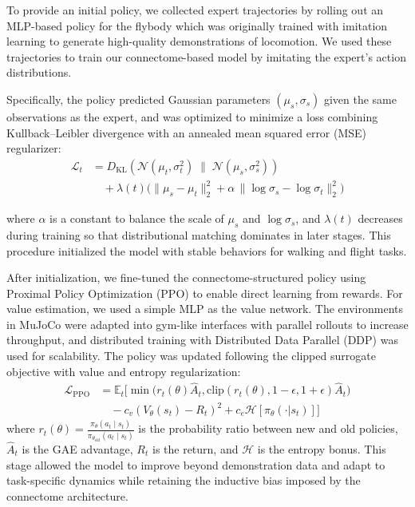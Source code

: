 \documentclass{article}
\theoremstyle{plain}
\theoremstyle{definition}
\theoremstyle{remark}
\begin{document}
To provide an initial policy, we collected expert trajectories by rolling out an MLP-based policy for the flybody which was originally trained with imitation learning to generate high-quality demonstrations of locomotion. We used these trajectories to train our connectome-based model by imitating the expert’s action distributions. 

Specifically, the policy predicted Gaussian parameters $(\mu_s, \sigma_s)$ given the same observations as the expert, and was optimized to minimize a loss combining Kullback–Leibler divergence with an annealed mean squared error (MSE) regularizer:
\begin{equation}
\begin{aligned}
    \mathcal{L}_t &= D_{\mathrm{KL}}\!\left( \mathcal{N}(\mu_t, \sigma_t^2) \;\|\; \mathcal{N}(\mu_s, \sigma_s^2) \right) \\
    &\quad + \lambda(t) \Big( \|\mu_s - \mu_t\|_2^2 + \alpha \,\|\log \sigma_s - \log \sigma_t\|_2^2 \Big)
\end{aligned}
\end{equation}

where $\alpha$ is a constant to balance the scale of $\mu_s$ and $\log \sigma_s$, and $\lambda(t)$ decreases during training so that distributional matching dominates in later stages. This procedure initialized the model with stable behaviors for walking and flight tasks.


After initialization, we fine-tuned the connectome-structured policy using Proximal Policy Optimization (PPO) to enable direct learning from rewards. For value estimation, we used a simple MLP as the value network. The environments in MuJoCo were adapted into gym-like interfaces with parallel rollouts to increase throughput, and distributed training with Distributed Data Parallel (DDP) was used for scalability. The policy was updated following the clipped surrogate objective with value and entropy regularization:
\begin{equation}
\begin{aligned}
\mathcal{L}_{\text{PPO}} &= \mathbb{E}_t \Big[ \min\big(r_t(\theta) \hat{A}_t, \text{clip}(r_t(\theta), 1-\epsilon, 1+\epsilon)\hat{A}_t\big) \\
&\quad - c_v (V_\theta(s_t) - R_t)^2 + c_e \mathcal{H}[\pi_\theta(\cdot|s_t)] \Big]
\end{aligned}
\end{equation}
where $ r_t(\theta)=\frac{\pi_\theta(a_t \mid s_t)}{\pi_{\theta_{\text{old}}}(a_t \mid s_t)} $ is the probability ratio between new and old policies, $\hat{A}_t$ is the GAE advantage, $R_t$ is the return, and $\mathcal{H}$ is the entropy bonus. This stage allowed the model to improve beyond demonstration data and adapt to task-specific dynamics while retaining the inductive bias imposed by the connectome architecture.
\end{document}
